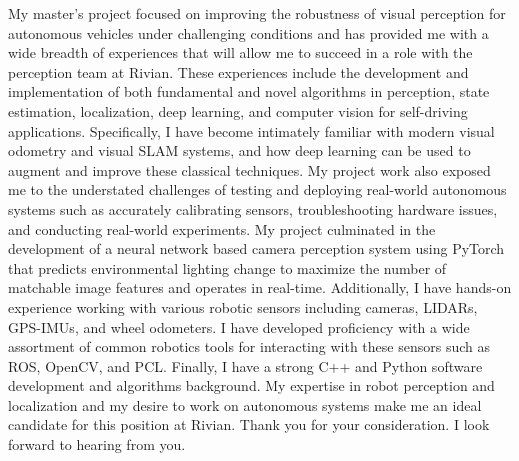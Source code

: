 \documentclass[11pt, a4paper]{awesome-cv}
\begin{document}
\begin{cvletter}
My master's project focused on improving the robustness of visual perception for autonomous vehicles under challenging conditions and has provided me with a wide breadth of experiences that will allow me to succeed in a role with the perception team at Rivian. These experiences include the development and implementation of both fundamental and novel algorithms in perception, state estimation, localization, deep learning, and computer vision for self-driving applications. Specifically, I have become intimately familiar with modern visual odometry and visual SLAM systems, and how deep learning can be used to augment and improve these classical techniques. My project work also exposed me to the understated challenges of testing and deploying real-world autonomous systems such as accurately calibrating sensors, troubleshooting hardware issues, and conducting real-world experiments. My project culminated in the development of a neural network based camera perception system using PyTorch that predicts environmental lighting change to maximize the number of matchable image features and operates in real-time. Additionally, I have hands-on experience working with various robotic sensors including cameras, LIDARs, GPS-IMUs, and wheel odometers. I have developed proficiency with a wide assortment of common robotics tools for interacting with these sensors such as ROS, OpenCV, and PCL. Finally, I have a strong C++ and Python software development and algorithms background. My expertise in robot perception and localization and my desire to work on autonomous systems make me an ideal candidate for this position at Rivian. Thank you for your consideration. I look forward to hearing from you.
\end{cvletter}

\makeletterclosing
\end{document}
